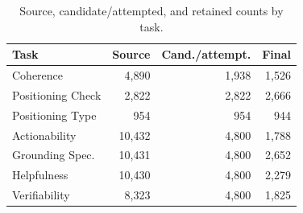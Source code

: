 \begin{table}[H]
\centering
\fontsize{9.5pt}{10.8pt}\selectfont
\renewcommand{\arraystretch}{0.88}
\setlength{\tabcolsep}{1.8pt}
\begin{tabular*}{\columnwidth}
  {@{\extracolsep{\fill}}lrrr@{}}
\toprule
Task & Source & Cand./attempt. & Final \\
\midrule
Coherence & 4,890 & 1,938 & 1,526 \\
Positioning Check & 2,822 & 2,822 & 2,666 \\
Positioning Type & 954 & 954 & 944 \\
Actionability & 10,432 & 4,800 & 1,788 \\
Grounding Spec. & 10,431 & 4,800 & 2,652 \\
Helpfulness & 10,430 & 4,800 & 2,279 \\
Verifiability & 8,323 & 4,800 & 1,825 \\
\bottomrule
\end{tabular*}

\caption{Source, candidate/attempted, and retained counts by task.}
\label{tab:data-filter-coverage}
\end{table}


